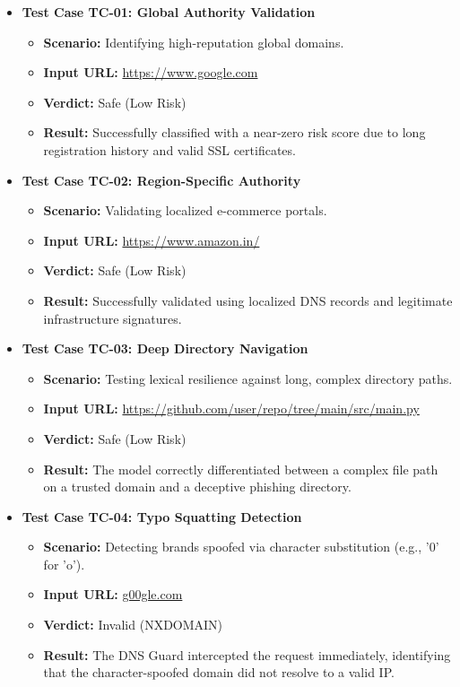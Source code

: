 \begin{itemize}
    \item \textbf{Test Case TC-01: Global Authority Validation}
    \begin{itemize}
        \item \textbf{Scenario:} Identifying high-reputation global domains.
        \item \textbf{Input URL:} \url{https://www.google.com}
        \item \textbf{Verdict:} Safe (Low Risk)
        \item \textbf{Result:} Successfully classified with a near-zero risk score due to long registration history and valid SSL certificates.
    \end{itemize}

    \item \textbf{Test Case TC-02: Region-Specific Authority}
    \begin{itemize}
        \item \textbf{Scenario:} Validating localized e-commerce portals.
        \item \textbf{Input URL:} \url{https://www.amazon.in/}
        \item \textbf{Verdict:} Safe (Low Risk)
        \item \textbf{Result:} Successfully validated using localized DNS records and legitimate infrastructure signatures.
    \end{itemize}

    \item \textbf{Test Case TC-03: Deep Directory Navigation}
    \begin{itemize}
        \item \textbf{Scenario:} Testing lexical resilience against long, complex directory paths.
        \item \textbf{Input URL:} \url{https://github.com/user/repo/tree/main/src/main.py}
        \item \textbf{Verdict:} Safe (Low Risk)
        \item \textbf{Result:} The model correctly differentiated between a complex file path on a trusted domain and a deceptive phishing directory.
    \end{itemize}

    \item \textbf{Test Case TC-04: Typo Squatting Detection}
    \begin{itemize}
        \item \textbf{Scenario:} Detecting brands spoofed via character substitution (e.g., '0' for 'o').
        \item \textbf{Input URL:} \url{g00gle.com}
        \item \textbf{Verdict:} Invalid (NXDOMAIN)
        \item \textbf{Result:} The DNS Guard intercepted the request immediately, identifying that the character-spoofed domain did not resolve to a valid IP.
    \end{itemize}


\end{itemize}
